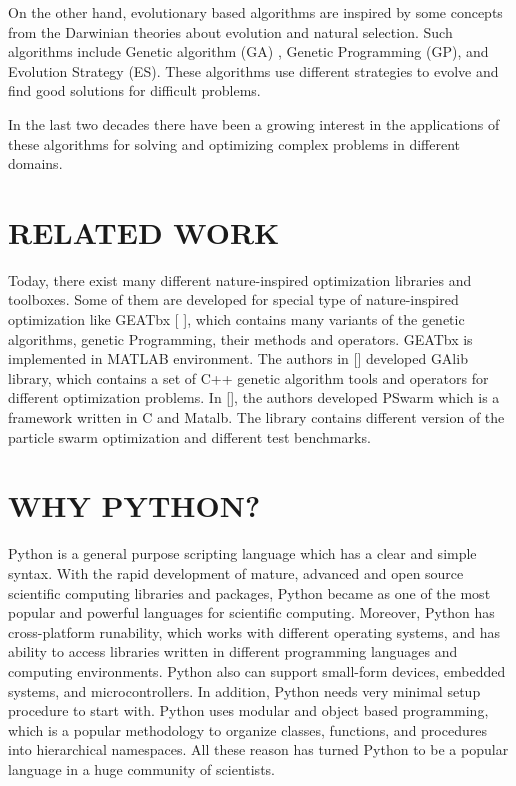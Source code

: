 \documentclass[a4paper,twoside]{article}
\begin{document}
On the other hand, evolutionary based algorithms are inspired by some concepts from the Darwinian theories about evolution and natural selection. Such algorithms include Genetic algorithm (GA) \cite{Sivanandam}, Genetic Programming (GP)\cite{Koza1992}, and Evolution Strategy (ES)\cite{Beyer2002}. These algorithms use different strategies to evolve and find good solutions for difficult problems. 

In the last two decades there have been a growing interest in the applications of these algorithms for solving and optimizing complex problems  in different domains.



\section{\uppercase{Related Work}}
Today, there exist many different nature-inspired optimization libraries and toolboxes. Some of them are developed for special type of nature-inspired optimization like GEATbx [ ], which contains many variants of the genetic algorithms, genetic Programming, their methods and operators. GEATbx is implemented in MATLAB environment. The authors in [] developed GAlib library, which contains a set of C++ genetic algorithm tools and operators for different optimization problems. In [], the authors developed PSwarm which is a framework written in C and Matalb. The library contains different version of the particle swarm optimization and different test benchmarks. 

\section{\uppercase{Why Python?}}

Python is a general purpose scripting language which has a clear and simple syntax. With the rapid development of mature, advanced  and open source scientific computing libraries and packages, Python became as one of the most popular and powerful languages for scientific computing.
Moreover, Python has cross-platform runability, which works with different operating systems, and has ability to access libraries written in different programming languages and computing environments. Python also can support small-form devices, embedded systems, and microcontrollers. In addition, Python needs very minimal setup procedure to start with. Python uses modular and object based programming, which is a popular methodology to organize classes, functions, and procedures into hierarchical namespaces. All these reason has turned Python to be a popular language in a huge community of scientists. 
\end{document}
